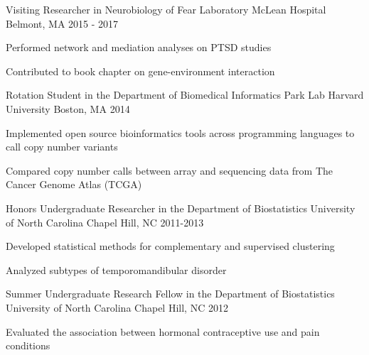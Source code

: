 \begin{cventries}
\cventry
{Visiting Researcher in Neurobiology of Fear Laboratory} %
{McLean Hospital} %
{Belmont, MA} %
{2015 - 2017} %
{
	\begin{cvitems} %
		\item {Performed network and mediation analyses on PTSD studies}
		\item {Contributed to book chapter on gene-environment interaction}
	\end{cvitems}
}

  \cventry
    {Rotation Student in the Department of Biomedical Informatics Park Lab} %
    {Harvard University} %
    {Boston, MA} %
    {2014} %
    {
      \begin{cvitems} %
        \item {Implemented open source bioinformatics tools across programming languages to call copy number variants}
        \item {Compared copy number calls between array and sequencing data from The Cancer Genome Atlas (TCGA)}
      \end{cvitems}
    }

\cventry
{Honors Undergraduate Researcher in the Department of Biostatistics} %
{ University of North Carolina} %
{Chapel Hill, NC} %
{2011-2013} %
{
	\begin{cvitems} %
		\item {Developed statistical methods for complementary and supervised clustering}
		\item {Analyzed subtypes of temporomandibular disorder}
	\end{cvitems}
}

\cventry
{Summer Undergraduate Research Fellow in the Department of Biostatistics} %
{ University of North Carolina} %
{Chapel Hill, NC} %
{2012} %
{
	\begin{cvitems} %
		\item {Evaluated the association between hormonal contraceptive use and pain conditions}
	\end{cvitems}
}


\end{cventries}
